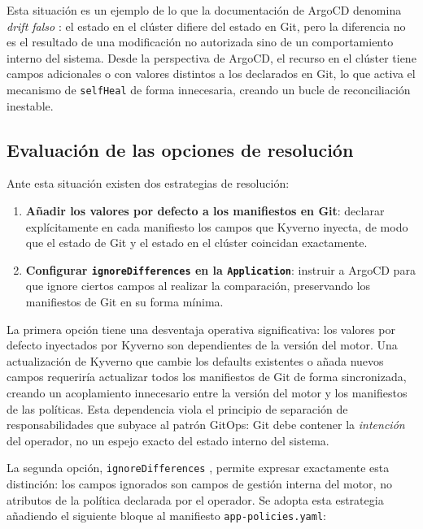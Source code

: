 Esta situación es un ejemplo de lo que la documentación de ArgoCD denomina \textit{drift falso} \cite{argocd_diffing}: el estado en el clúster difiere del estado en Git, pero la diferencia no es el resultado de una modificación no autorizada sino de un comportamiento interno del sistema. Desde la perspectiva de ArgoCD, el recurso en el clúster tiene campos adicionales o con valores distintos a los declarados en Git, lo que activa el mecanismo de \texttt{selfHeal} de forma innecesaria, creando un bucle de reconciliación inestable.

\subsection{Evaluación de las opciones de resolución}

Ante esta situación existen dos estrategias de resolución:

\begin{enumerate}
  \item \textbf{Añadir los valores por defecto a los manifiestos en Git}: declarar explícitamente en cada manifiesto los campos que Kyverno inyecta, de modo que el estado de Git y el estado en el clúster coincidan exactamente.
  \item \textbf{Configurar \texttt{ignoreDifferences} en la \texttt{Application}}: instruir a ArgoCD para que ignore ciertos campos al realizar la comparación, preservando los manifiestos de Git en su forma mínima.
\end{enumerate}

La primera opción tiene una desventaja operativa significativa: los valores por defecto inyectados por Kyverno son dependientes de la versión del motor. Una actualización de Kyverno que cambie los defaults existentes o añada nuevos campos requeriría actualizar todos los manifiestos de Git de forma sincronizada, creando un acoplamiento innecesario entre la versión del motor y los manifiestos de las políticas. Esta dependencia viola el principio de separación de responsabilidades que subyace al patrón GitOps: Git debe contener la \textit{intención} del operador, no un espejo exacto del estado interno del sistema.

La segunda opción, \texttt{ignoreDifferences} \cite{argocd_diffing}, permite expresar exactamente esta distinción: los campos ignorados son campos de gestión interna del motor, no atributos de la política declarada por el operador. Se adopta esta estrategia añadiendo el siguiente bloque al manifiesto \texttt{app-policies.yaml}:

